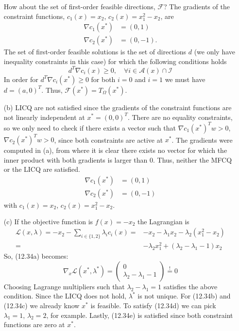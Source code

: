 \begin{enumerate}
          How about the set of first-order feasible directions, $\mathcal{F}$?
          The gradients of the constraint functions,  $c_1(x) = x_2$, $c_2(x) = x_1^2 - x_2$, are
          \begin{align*}
              \nabla c_1(x^*) & = (0, 1)   \\
              \nabla c_2(x^*) & = (0, -1).
          \end{align*}
          The set of first-order feasible solutions is the set of directions $d$ (we only have inequality constraints in this case) for which the following conditions holds
          \[
              d^T \nabla c_i(x) \geq 0, \quad \forall i \in \mathcal{A}(x) \cap \mathcal{I}
          \]
          In order for $d^T\nabla c_i(x^*) \geq 0$ for both $i=0$ and $i=1$ we must have $d = (a, 0)^T$.
          Thus, $\mathcal{F}(x^*) = T_\Omega(x^*)$.
    \item[(b)]
          LICQ are not satisfied since the gradients of the constraint functions are not linearly independent at $x^* = (0,0)^T$.
          There are no equality constraints, so we only need to check if there exists a vector such that $\nabla c_1(x^*)^T w > 0$, $\nabla c_2(x^*)^T w > 0$, since both constraints are active at $x^*$.
          The gradients were computed in (a), from where it is clear there exists no vector for which the inner product with both gradients is larger than 0.
          Thus, neither the MFCQ or the LICQ are satisfied.
          \begin{align*}
              \nabla c_1(x^*) & = (0, 1)  \\
              \nabla c_2(x^*) & = (0, -1)
          \end{align*}
          with $c_1(x) = x_2$, $c_2(x) = x_1^2 - x_2$.
    \item[(c)]
          If the objective function is $f(x) = -x_2$ the Lagrangian is
          \begin{align*}
              \mathcal{L}(x, \lambda) = -x_2 - \sum_{i\in\{1,2\}} \lambda_i c_i(x) = & -x_2 -\lambda_1 x_2 - \lambda_2(x_1^2 - x_2)     \\
              =                                                                      & -\lambda_2x_1^2 + (\lambda_2 - \lambda_1 - 1)x_2
          \end{align*}
          So, (12.34a) becomes:
          \[
              \nabla_x\mathcal{L}(x^*, \lambda^*) = \begin{pmatrix}
                  0 \\
                  \lambda_2 - \lambda_1 - 1
              \end{pmatrix} \overset{!}{=} 0
          \]
          Choosing Lagrange multipliers such that $\lambda_2 - \lambda_1 = 1$ satisfies the above condition.
          Since the LICQ does not hold, $\lambda^*$ is not unique.
          For (12.34b) and (12.34c) we already know $x^*$ is feasible.
          To satisfy (12.34d) we can pick $\lambda_1 = 1$, $\lambda_2 = 2$, for example.
          Lastly, (12.34e) is satisfied since both constraint functions are zero at $x^*$.


\end{enumerate}
